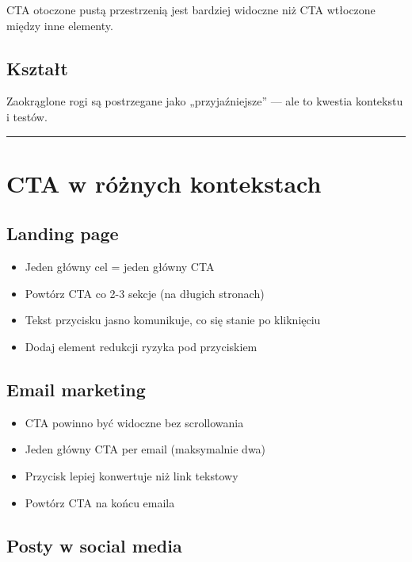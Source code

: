 \documentclass[
  12pt,
  a4paper,
  twoside,
  openright,
  12pt,
  DIV=12,
  BCOR=12mm]{scrbook}
\providecommand{\tightlist}{%
  \setlength{\itemsep}{0pt}\setlength{\parskip}{0pt}}\usepackage{longtable,booktabs,array}
\newcommand{\decoline}{%
  \begin{center}
    \textcolor{bordergray}{\rule{0.3\textwidth}{0.5pt}}
  \end{center}
}
\begin{document}
CTA otoczone pustą przestrzenią jest bardziej widoczne niż CTA wtłoczone
między inne elementy.

\subsection{Kształt}\label{ksztaux142t}

Zaokrąglone rogi są postrzegane jako „przyjaźniejsze'' --- ale to
kwestia kontekstu i testów.

\decoline

\section{CTA w różnych
kontekstach}\label{cta-w-ruxf3ux17cnych-kontekstach}

\subsection{Landing page}\label{landing-page}

\begin{itemize}
\tightlist
\item
  Jeden główny cel = jeden główny CTA
\item
  Powtórz CTA co 2-3 sekcje (na długich stronach)
\item
  Tekst przycisku jasno komunikuje, co się stanie po kliknięciu
\item
  Dodaj element redukcji ryzyka pod przyciskiem
\end{itemize}

\subsection{Email marketing}\label{email-marketing}

\begin{itemize}
\tightlist
\item
  CTA powinno być widoczne bez scrollowania
\item
  Jeden główny CTA per email (maksymalnie dwa)
\item
  Przycisk lepiej konwertuje niż link tekstowy
\item
  Powtórz CTA na końcu emaila
\end{itemize}

\subsection{Posty w social media}\label{posty-w-social-media}
\end{document}

